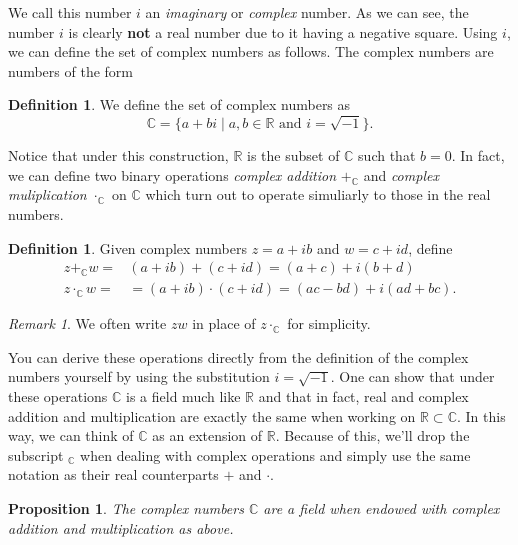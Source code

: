 \documentclass[12pt]{article}
\newcommand{\bbR}{\mathbb{R}}
\newcommand{\bbC}{\mathbb{C}}
\newtheorem{prop}[thm]{Proposition}
\theoremstyle{definition}
\newtheorem{defn}[thm]{Definition}
\theoremstyle{remark}
\newtheorem{rem}[thm]{Remark}
\numberwithin{equation}{section}
\begin{document}
We call this number $i$ an \emph{imaginary} or \emph{complex} number. As we can see, the number $i$ is clearly \textbf{not} a real number due to it having a negative square. Using $i$, we can define the set of complex numbers as follows. The complex numbers are numbers of the form 

\begin{defn}
  We define the set of complex numbers as 
\begin{equation}
  \bbC = \{ a + bi \mid a, b \in \bbR \text{ and } i = \sqrt{-1} \}.
\end{equation}
\end{defn}

Notice that under this construction, $\bbR$ is the subset of $\bbC$ such that $b=0$. In fact, we can define two binary operations \emph{complex addition} $+_\bbC$ and \emph{complex muliplication} $\cdot_\bbC$ on $\bbC$ which turn out to operate simuliarly to those in the real numbers.

\begin{defn}
  Given complex numbers $z=a+ib$ and $w=c+id$, define
\begin{align}
  z +_\bbC w=& (a+ib)+(c+id)=(a+c)+i(b+d)\\
  z\cdot_\bbC w=&= (a+ib)\cdot(c+id)=(ac-bd)+ i(ad+bc).
\end{align}
\end{defn}

\begin{rem}
  We often write $zw$ in place of $z\cdot_\bbC$ for simplicity.
\end{rem}


You can derive these operations directly from the definition of the complex numbers yourself by using the substitution $i = \sqrt{-1}$. One can show that under these operations $\bbC$ is a field much like $\bbR$ and that in fact, real and complex addition and multiplication are exactly the same when working on $\bbR \subset \bbC$. In this way, we can think of $\bbC$ as an extension of $\bbR$. Because of this, we'll drop the subscript $_\bbC$ when dealing with complex operations and simply use the same notation as their real counterparts $+$ and $\cdot$.

\begin{prop}
  The complex numbers $\bbC$ are a field when endowed with complex addition and multiplication as above.
\end{prop}
\end{document}
